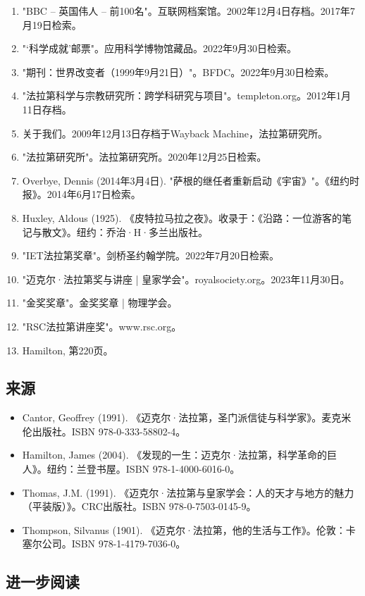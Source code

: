 \begin{enumerate}
\item "BBC – 英国伟人 – 前100名"。互联网档案馆。2002年12月4日存档。2017年7月19日检索。
\item "‘科学成就’邮票"。应用科学博物馆藏品。2022年9月30日检索。
\item "期刊：世界改变者（1999年9月21日）"。BFDC。2022年9月30日检索。
\item "法拉第科学与宗教研究所：跨学科研究与项目"。templeton.org。2012年1月11日存档。
\item 关于我们。2009年12月13日存档于Wayback Machine，法拉第研究所。
\item "法拉第研究所"。法拉第研究所。2020年12月25日检索。
\item Overbye, Dennis (2014年3月4日). "萨根的继任者重新启动《宇宙》"。《纽约时报》。2014年6月17日检索。
\item Huxley, Aldous (1925). 《皮特拉马拉之夜》。收录于：《沿路：一位游客的笔记与散文》。纽约：乔治·H·多兰出版社。
\item "IET法拉第奖章"。剑桥圣约翰学院。2022年7月20日检索。
\item "迈克尔·法拉第奖与讲座 | 皇家学会"。royalsociety.org。2023年11月30日。
\item "金奖奖章"。金奖奖章 | 物理学会。
\item "RSC法拉第讲座奖"。www.rsc.org。
\item Hamilton, 第220页。
\end{enumerate}
\subsection{来源}
\begin{itemize}
\item Cantor, Geoffrey (1991). 《迈克尔·法拉第，圣门派信徒与科学家》。麦克米伦出版社。ISBN 978-0-333-58802-4。
\item Hamilton, James (2004). 《发现的一生：迈克尔·法拉第，科学革命的巨人》。纽约：兰登书屋。ISBN 978-1-4000-6016-0。
\item Thomas, J.M. (1991). 《迈克尔·法拉第与皇家学会：人的天才与地方的魅力（平装版）》。CRC出版社。ISBN 978-0-7503-0145-9。
\item Thompson, Silvanus (1901). 《迈克尔·法拉第，他的生活与工作》。伦敦：卡塞尔公司。ISBN 978-1-4179-7036-0。
\end{itemize}
\subsection{进一步阅读}
